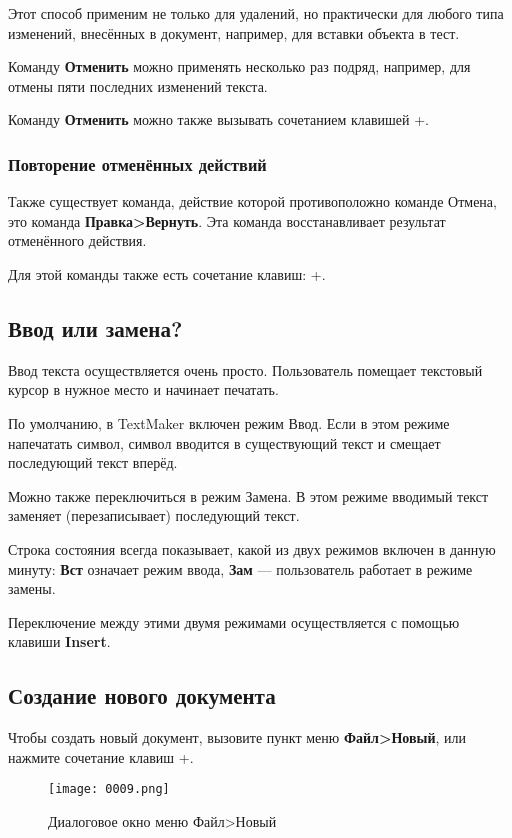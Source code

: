 ﻿\documentclass[a4paper,10pt]{article}
\begin{document}
Этот способ применим не только для удалений, но практически для любого типа изменений, внесённых в документ, например, для вставки объекта в тест.

Команду \textbf{Отменить} можно применять несколько раз подряд, например, для отмены пяти последних изменений текста.

Команду \textbf{Отменить} можно также вызывать сочетанием клавишей +.

\subsubsection{Повторение отменённых действий}
Также существует команда, действие которой противоположно команде Отмена, это команда \textbf{Правка>Вернуть}. Эта команда восстанавливает результат отменённого действия.

Для этой команды также есть сочетание клавиш: +.

\subsection{Ввод или замена?}
Ввод текста осуществляется очень просто. Пользователь помещает текстовый курсор в нужное место и начинает печатать.

По умолчанию, в TextMaker включен режим Ввод. Если в этом режиме напечатать символ, символ вводится в существующий текст и смещает последующий текст вперёд.

Можно также переключиться в режим Замена. В этом режиме вводимый текст заменяет (перезаписывает) последующий текст.

Строка состояния всегда показывает, какой из двух режимов включен в данную минуту: \textbf{Вст} означает режим ввода, \textbf{Зам} — пользователь работает в режиме замены.

Переключение между этими двумя режимами осуществляется с помощью клавиши \textbf{Insert}.

\subsection{Создание нового документа}
Чтобы создать новый документ, вызовите пункт меню \textbf{Файл>Новый}, или нажмите сочетание клавиш +.

\begin{figure}[ht]
\texttt{[image: 0009.png]}
\centering
\caption{Диалоговое окно меню Файл>Новый}
\end{figure}
\end{document}

